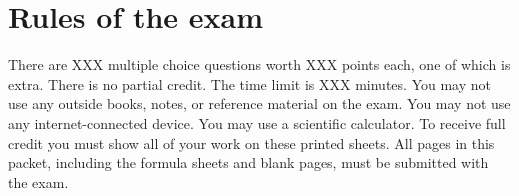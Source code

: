 

\ifprintanswers
\else
		\maketitle
		\section*{Rules of the exam}


		There are XXX multiple choice questions worth XXX points each, one of which is extra.
        There is no partial credit.
        The time limit is XXX minutes.  You may not use any outside books, notes, or reference material on the exam.  You may not use any internet-connected device.  You may use a scientific calculator.  To receive full credit you must show all of your work on these printed sheets.  All pages in this packet, including the formula sheets and blank pages, must be submitted with the exam.

        \begin{center}
\end{center}

